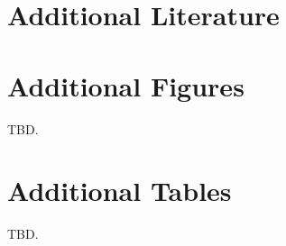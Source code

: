 \documentclass[template-combined]{subfiles}
\begin{document}



\clearpage
\setcounter{page}{1}
\appendix

\section{Additional Literature} \label{appendix:sec:literature}
\citet*{Card-1990-ILRR}

\clearpage
\section{Additional Figures}
TBD.

\clearpage
\section{Additional Tables}
TBD.




\makeatletter
{}
\makeatother
\end{document}

